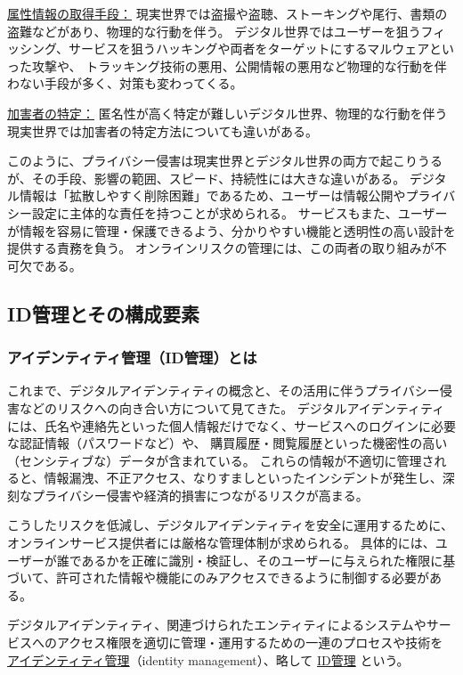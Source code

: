 \documentclass[uplatex]{jsarticle}
\def\label#1{}%
\begin{document}
\underline{属性情報の取得手段：}
現実世界では盗撮や盗聴、ストーキングや尾行、書類の盗難などがあり、物理的な行動を伴う。
デジタル世界ではユーザーを狙うフィッシング、サービスを狙うハッキングや両者をターゲットにするマルウェアといった攻撃や、
トラッキング技術の悪用、公開情報の悪用など物理的な行動を伴わない手段が多く、対策も変わってくる。

\underline{加害者の特定：}
匿名性が高く特定が難しいデジタル世界、物理的な行動を伴う現実世界では加害者の特定方法についても違いがある。

このように、プライバシー侵害は現実世界とデジタル世界の両方で起こりうるが、その手段、影響の範囲、スピード、持続性には大きな違いがある。
デジタル情報は「拡散しやすく削除困難」であるため、ユーザーは情報公開やプライバシー設定に主体的な責任を持つことが求められる。
サービスもまた、ユーザーが情報を容易に管理・保護できるよう、分かりやすい機能と透明性の高い設計を提供する責務を負う。
オンラインリスクの管理には、この両者の取り組みが不可欠である。

\subsection{ID管理とその構成要素}

\subsubsection{アイデンティティ管理（ID管理）とは}

これまで、デジタルアイデンティティの概念と、その活用に伴うプライバシー侵害などのリスクへの向き合い方について見てきた。
デジタルアイデンティティには、氏名や連絡先といった個人情報だけでなく、サービスへのログインに必要な認証情報（パスワードなど）や、
購買履歴・閲覧履歴といった機密性の高い（センシティブな）データが含まれている。
これらの情報が不適切に管理されると、情報漏洩、不正アクセス、なりすましといったインシデントが発生し、深刻なプライバシー侵害や経済的損害につながるリスクが高まる。

こうしたリスクを低減し、デジタルアイデンティティを安全に運用するために、オンラインサービス提供者には厳格な管理体制が求められる。
具体的には、ユーザーが誰であるかを正確に識別・検証し、そのユーザーに与えられた権限に基づいて、許可された情報や機能にのみアクセスできるように制御する必要がある。

\begin{dfn}\label{dfn:identity-management}
デジタルアイデンティティ、関連づけられたエンティティによるシステムやサービスへのアクセス権限を適切に管理・運用するための一連のプロセスや技術を
\underline{アイデンティティ管理}（identity management）、略して \underline{ID管理} という。
\end{dfn}
\end{document}
